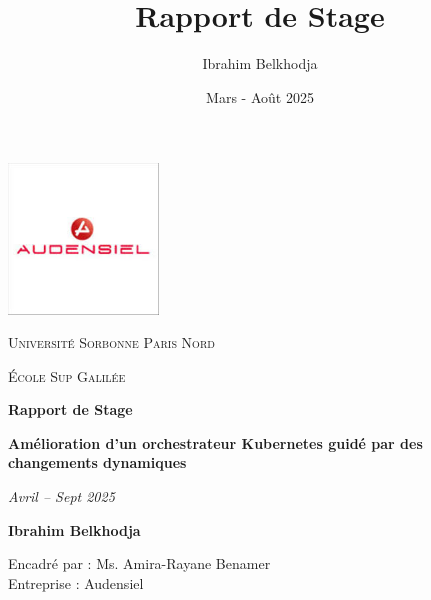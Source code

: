 \documentclass[12pt]{report}
\title{Rapport de Stage}
\author{Ibrahim Belkhodja}
\date{Mars - Août 2025}
\begin{document}
\begin{titlepage}
    \centering
    \includegraphics[width=0.3\textwidth]{images/logo.png}\par
    \vspace{1cm}
    {\scshape\LARGE Université Sorbonne Paris Nord \par}
    \vspace{1cm}
    {\scshape\Large École Sup Galilée\par}
    \vspace{1.5cm}
    {\huge\bfseries Rapport de Stage\par}
    \vspace{0.5cm}
    {\Large\bfseries   Amélioration d’un orchestrateur Kubernetes guidé par des changements dynamiques \par}
    \vspace{0.5cm}
    {\Large\itshape Avril – Sept 2025\par}
    \vspace{2.5cm}
    {\Large\bfseries Ibrahim Belkhodja\par}
    \vfill
    {\large Encadré par : Ms. Amira-Rayane Benamer \\ Entreprise : Audensiel\par}
    \vspace{1cm}
\end{titlepage}

\tableofcontents
\clearpage







\end{document}
